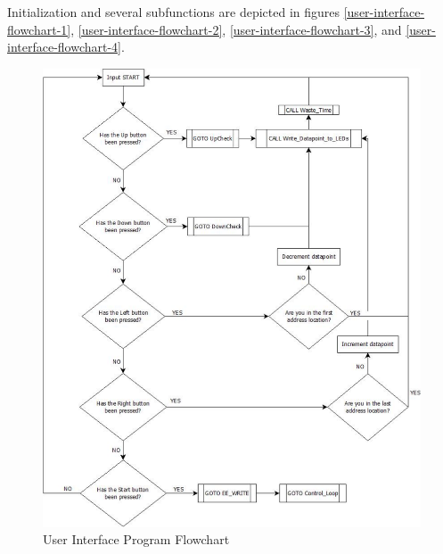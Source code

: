 \documentclass[10pt, twocolumn]{article}
\begin{document}
Initialization and several subfunctions are depicted in figures
\ref{user-interface-flowchart-1},
\ref{user-interface-flowchart-2},
\ref{user-interface-flowchart-3}, and
\ref{user-interface-flowchart-4}.

\begin{figure}
	\centering
	\includegraphics[width=1\textwidth]{Figures/user-interface-flowchart.pdf}
	\caption{User Interface Program Flowchart}
	\label{user-interface-flowchart}
\end{figure}
\end{document}
